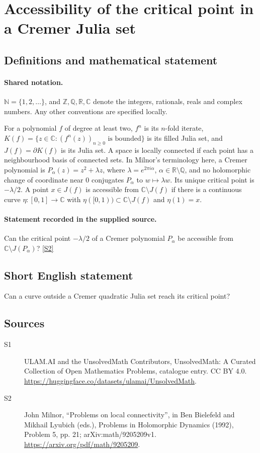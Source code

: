 \documentclass[11pt]{article}
\newcommand{\sref}[2]{\hyperlink{source:#1:#2}{[S#2]}}
\begin{document}
\section{Accessibility of the critical point in a Cremer Julia set}\label{statement}

\subsection{Definitions and mathematical statement}

\paragraph{Shared notation.}$\mathbb N=\{1,2,\ldots\}$, and $\mathbb Z,\mathbb Q,\mathbb R,\mathbb C$ denote the integers, rationals, reals and complex numbers. Any other conventions are specified locally.


For a polynomial $f$ of degree at least two, $f^n$ is its $n$-fold iterate, $K(f)=\{z\in\mathbb C:(f^n(z))_{n\geq0}\text{ is bounded}\}$ is its filled Julia set, and $J(f)=\partial K(f)$ is its Julia set. A space is locally connected if each point has a neighbourhood basis of connected sets. In Milnor's terminology here, a Cremer polynomial is $P_\alpha(z)=z^2+\lambda z$, where $\lambda=e^{2\pi i\alpha}$, $\alpha\in\mathbb R\setminus\mathbb Q$, and no holomorphic change of coordinate near $0$ conjugates $P_\alpha$ to $w\mapsto\lambda w$. Its unique critical point is $-\lambda/2$. A point $x\in J(f)$ is accessible from $\mathbb C\setminus J(f)$ if there is a continuous curve $\eta:[0,1]\to\mathbb C$ with $\eta([0,1))\subset\mathbb C\setminus J(f)$ and $\eta(1)=x$.
\paragraph{Statement recorded in the supplied source.}
Can the critical point $-\lambda/2$ of a Cremer polynomial $P_\alpha$ be accessible from $\mathbb C\setminus J(P_\alpha)$? \sref{statement}{2}
\subsection{Short English statement}
Can a curve outside a Cremer quadratic Julia set reach its critical point?
\subsection{Sources}
\begin{description}
\item[\hypertarget{source:statement:1}{S1}] ULAM.AI and the UnsolvedMath Contributors, UnsolvedMath: A Curated Collection of Open Mathematics Problems, catalogue entry. CC BY 4.0. \url{https://huggingface.co/datasets/ulamai/UnsolvedMath}.
\item[\hypertarget{source:statement:2}{S2}] John Milnor, ``Problems on local connectivity'', in Ben Bielefeld and Mikhail Lyubich (eds.), Problems in Holomorphic Dynamics (1992), Problem 5, pp. 21; arXiv:math/9205209v1. \url{https://arxiv.org/pdf/math/9205209}.
\end{description}
\label{end:statement}
\end{document}
